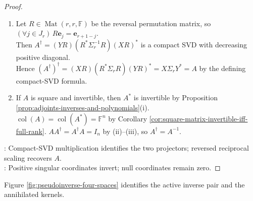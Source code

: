 \begin{theorem}
\begin{proof}
\begin{enumerate}[label=(\roman*)]
\item Let $R\in\operatorname{Mat}(r,r,\mathbb{F})$ be the reversal permutation matrix, so $(\forall j\in J_r)\,R\mathbf{e}_j=\mathbf{e}_{r+1-j}$.\\
Then $A^{\dagger}=(YR)(R^*\Sigma_r^{-1}R)(XR)^*$ is a compact SVD with decreasing positive diagonal.\\
Hence $(A^{\dagger})^{\dagger}=(XR)(R^*\Sigma_rR)(YR)^*=X\Sigma_rY^*=A$ by the defining compact-SVD formula.
\item If $A$ is square and invertible, then $A^*$ is invertible by Proposition \ref{prop:adjoints-inverses-and-polynomials}(i).\\
$\operatorname{col}(A)=\operatorname{col}(A^*)=\mathbb{F}^n$ by Corollary \ref{cor:square-matrix-invertible-iff-full-rank}. $AA^{\dagger}=A^{\dagger}A=I_n$ by (ii)--(iii), so $A^{\dagger}=A^{-1}$.
\end{enumerate}
: Compact-SVD multiplication identifies the two projectors; reversed reciprocal scaling recovers $A$.\\
: Positive singular coordinates invert; null coordinates remain zero.
\end{proof}
\end{theorem}

Figure \ref{fig:pseudoinverse-four-spaces} identifies the active inverse pair and the annihilated kernels.

\begin{illustrationfigure}[H]
  \centering
  
  \caption{The arrows invert the active singular subspaces; the outer boxes mark $\ker(A)$ and $\ker(A^*)$.}
  \label{fig:pseudoinverse-four-spaces}
\end{illustrationfigure}

